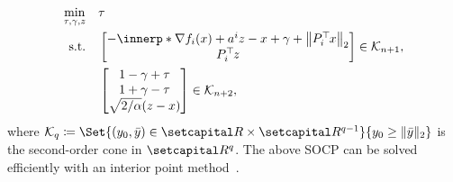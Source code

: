\documentclass[../../main]{subfiles}
\begin{document}
\begin{equation}\label{eq:socp}
    \begin{aligned}
        \min_{\tau, \gamma, z} \quad & \tau                                                                                 \\
        \st    \quad                 & \begin{bmatrix} - \innerp*{\nabla f_i(x) + a^i}{z - x} + \gamma + \norm*{P_i^\T x}_2 \\
                                           P_i^\T z
                                       \end{bmatrix} \in \mathcal{K}_{n + 1}, \\
                                     & \begin{bmatrix} 1 - \gamma + \tau \\
                                           1 + \gamma - \tau \\
                                           \sqrt{2 / \alpha} (z - x)
                                       \end{bmatrix} \in \mathcal{K}_{n + 2},
    \end{aligned}
\end{equation}
where $\mathcal{K}_q \coloneqq \Set{(y_0, \bar{y}) \in \setR \times \setR^{q - 1} }{ y_0 \geq \norm{ \bar{y} }_2}$ is the second-order cone in $\setR^{q}$.
The above SOCP can be solved efficiently with an interior point method~\cite{Alizadeh2003}.
\end{document}

